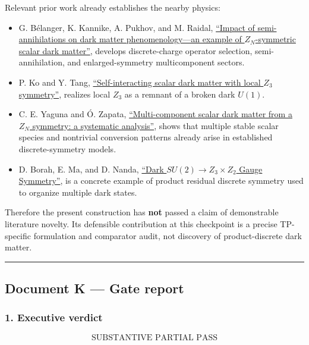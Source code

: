\documentclass[
]{article}
\providecommand{\tightlist}{%
  \setlength{\itemsep}{0pt}\setlength{\parskip}{0pt}}
\begin{document}
Relevant prior work already establishes the nearby physics:

\begin{itemize}
\tightlist
\item
  G. Bélanger, K. Kannike, A. Pukhov, and M. Raidal,
  \href{https://arxiv.org/abs/1202.2962}{``Impact of semi-annihilations
  on dark matter phenomenology---an example of \(Z_N\)-symmetric scalar
  dark matter''}, develops discrete-charge operator selection,
  semi-annihilation, and enlarged-symmetry multicomponent sectors.
\item
  P. Ko and Y. Tang,
  \href{https://arxiv.org/abs/1402.6449}{``Self-interacting scalar dark
  matter with local \(Z_3\) symmetry''}, realizes local \(Z_3\) as a
  remnant of a broken dark \(U(1)\).
\item
  C. E. Yaguna and Ó. Zapata,
  \href{https://arxiv.org/abs/1911.05515}{``Multi-component scalar dark
  matter from a \(Z_N\) symmetry: a systematic analysis''}, shows that
  multiple stable scalar species and nontrivial conversion patterns
  already arise in established discrete-symmetry models.
\item
  D. Borah, E. Ma, and D. Nanda,
  \href{https://arxiv.org/abs/2212.11847}{``Dark
  \(SU(2)\to Z_3\times Z_2\) Gauge Symmetry''}, is a concrete example of
  product residual discrete symmetry used to organize multiple dark
  states.
\end{itemize}

Therefore the present construction has \textbf{not} passed a claim of
demonstrable literature novelty. Its defensible contribution at this
checkpoint is a precise TP-specific formulation and comparator audit,
not discovery of product-discrete dark matter.

\begin{center}\rule{0.5\linewidth}{0.5pt}\end{center}

\hypertarget{document-k-gate-report}{%
\subsection{Document K --- Gate report}\label{document-k-gate-report}}

\hypertarget{executive-verdict-1}{%
\subsubsection{1. Executive verdict}\label{executive-verdict-1}}

\[
\boxed{\text{SUBSTANTIVE PARTIAL PASS}}
\]
\end{document}
